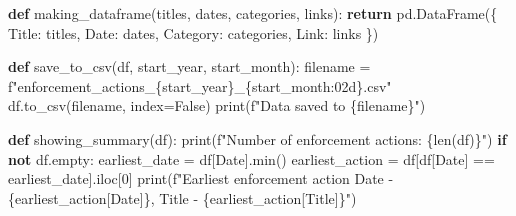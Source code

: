 \documentclass[
  letterpaper,
  DIV=11,
  numbers=noendperiod]{scrartcl}
\newenvironment{Shaded}{\begin{snugshade}}{\end{snugshade}}
\newcommand{\BuiltInTok}[1]{\textcolor[rgb]{0.00,0.23,0.31}{#1}}
\newcommand{\ControlFlowTok}[1]{\textcolor[rgb]{0.00,0.23,0.31}{\textbf{#1}}}
\newcommand{\DecValTok}[1]{\textcolor[rgb]{0.68,0.00,0.00}{#1}}
\newcommand{\KeywordTok}[1]{\textcolor[rgb]{0.00,0.23,0.31}{\textbf{#1}}}
\newcommand{\NormalTok}[1]{\textcolor[rgb]{0.00,0.23,0.31}{#1}}
\newcommand{\OperatorTok}[1]{\textcolor[rgb]{0.37,0.37,0.37}{#1}}
\newcommand{\SpecialCharTok}[1]{\textcolor[rgb]{0.37,0.37,0.37}{#1}}
\newcommand{\SpecialStringTok}[1]{\textcolor[rgb]{0.13,0.47,0.30}{#1}}
\newcommand{\StringTok}[1]{\textcolor[rgb]{0.13,0.47,0.30}{#1}}
\newcommand{\VariableTok}[1]{\textcolor[rgb]{0.07,0.07,0.07}{#1}}
\begin{document}
\begin{Shaded}
\begin{Highlighting}[]
\KeywordTok{def}\NormalTok{ making\_dataframe(titles, dates, categories, links):}
    \ControlFlowTok{return}\NormalTok{ pd.DataFrame(\{}
        \StringTok{\textquotesingle{}Title\textquotesingle{}}\NormalTok{: titles,}
        \StringTok{\textquotesingle{}Date\textquotesingle{}}\NormalTok{: dates,}
        \StringTok{\textquotesingle{}Category\textquotesingle{}}\NormalTok{: categories,}
        \StringTok{\textquotesingle{}Link\textquotesingle{}}\NormalTok{: links}
\NormalTok{    \})}
\end{Highlighting}
\end{Shaded}

\begin{Shaded}
\begin{Highlighting}[]
\KeywordTok{def}\NormalTok{ save\_to\_csv(df, start\_year, start\_month):}
\NormalTok{    filename }\OperatorTok{=} \SpecialStringTok{f"enforcement\_actions\_}\SpecialCharTok{\{}\NormalTok{start\_year}\SpecialCharTok{\}}\SpecialStringTok{\_}\SpecialCharTok{\{}\NormalTok{start\_month}\SpecialCharTok{:02d\}}\SpecialStringTok{.csv"}
\NormalTok{    df.to\_csv(filename, index}\OperatorTok{=}\VariableTok{False}\NormalTok{)}
    \BuiltInTok{print}\NormalTok{(}\SpecialStringTok{f"Data saved to }\SpecialCharTok{\{}\NormalTok{filename}\SpecialCharTok{\}}\SpecialStringTok{"}\NormalTok{)}
\end{Highlighting}
\end{Shaded}

\begin{Shaded}
\begin{Highlighting}[]
\KeywordTok{def}\NormalTok{ showing\_summary(df):}
    \BuiltInTok{print}\NormalTok{(}\SpecialStringTok{f"Number of enforcement actions: }\SpecialCharTok{\{}\BuiltInTok{len}\NormalTok{(df)}\SpecialCharTok{\}}\SpecialStringTok{"}\NormalTok{)}
    \ControlFlowTok{if} \KeywordTok{not}\NormalTok{ df.empty:}
\NormalTok{        earliest\_date }\OperatorTok{=}\NormalTok{ df[}\StringTok{\textquotesingle{}Date\textquotesingle{}}\NormalTok{].}\BuiltInTok{min}\NormalTok{()}
\NormalTok{        earliest\_action }\OperatorTok{=}\NormalTok{ df[df[}\StringTok{\textquotesingle{}Date\textquotesingle{}}\NormalTok{] }\OperatorTok{==}\NormalTok{ earliest\_date].iloc[}\DecValTok{0}\NormalTok{]}
        \BuiltInTok{print}\NormalTok{(}\SpecialStringTok{f"Earliest enforcement action Date {-} }\SpecialCharTok{\{}\NormalTok{earliest\_action[}\StringTok{\textquotesingle{}Date\textquotesingle{}}\NormalTok{]}\SpecialCharTok{\}}\SpecialStringTok{, Title {-} }\SpecialCharTok{\{}\NormalTok{earliest\_action[}\StringTok{\textquotesingle{}Title\textquotesingle{}}\NormalTok{]}\SpecialCharTok{\}}\SpecialStringTok{"}\NormalTok{)}
\end{Highlighting}
\end{Shaded}
\end{document}
